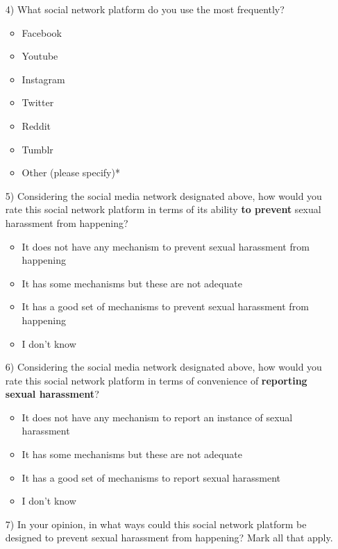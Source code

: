     \begin{adjustwidth}{0cm}{}

    \begin{itemize}
        \vspace{-10pt} \item [4)] What social network platform do you use the most frequently?
         \begin{itemize}
            \item Facebook
            \item Youtube
            \item Instagram
            \item Twitter
            \item Reddit
            \item Tumblr
            \item Other (please specify)*
        \end{itemize}
        \item [5)] Considering the social media network designated above, how would you rate this social network platform in terms of its ability \textbf{to prevent} sexual harassment from happening?
        \begin{itemize}
            \item It does not have any mechanism to prevent sexual harassment from happening
            \item It has some mechanisms but these are not adequate
            \item It has a good set of mechanisms to prevent sexual harassment from happening
            \item I don't know
        \end{itemize}
        \item [6)] Considering the social media network designated above, how would you rate this social network platform in terms of convenience of \textbf{reporting sexual harassment}?
         \begin{itemize}
            \item It does not have any mechanism to report an instance of sexual harassment
            \item It has some mechanisms but these are not adequate
            \item It has a good set of mechanisms to report sexual harassment
            \item I don't know
        \end{itemize}
        \item [7)] In your opinion, in what ways could this social network platform be designed to prevent sexual harassment from happening? Mark all that apply.

\end{itemize}
\end{adjustwidth}
